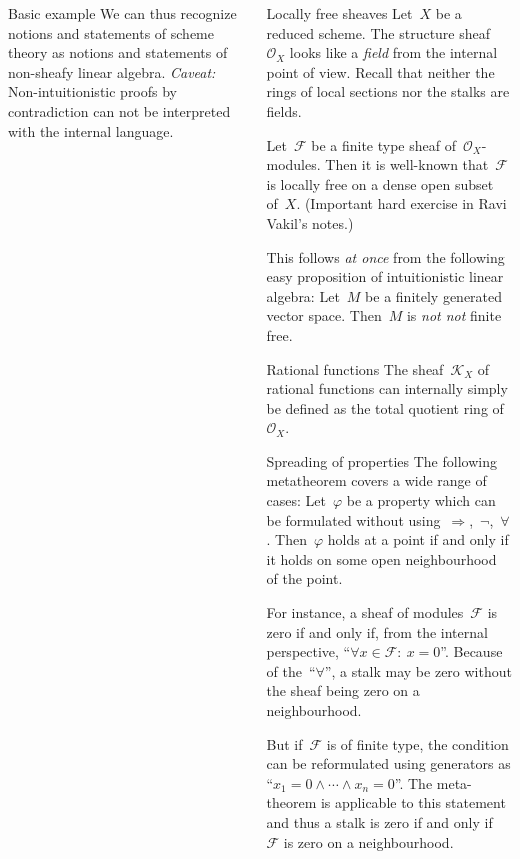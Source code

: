 \documentclass[table]{beamer}
\newcommand{\F}{\mathcal{F}}
\renewcommand{\O}{\mathcal{O}}
\newcommand{\K}{\mathcal{K}}
\begin{document}
\begin{frame}[t]
\begin{columns}[t]
\begin{column}{0.3\textwidth}
\begin{block}{Basic example}
    We can thus recognize notions and statements of scheme theory as notions and
    statements of non-sheafy linear algebra.
    \emph{Caveat:} Non-intuitionistic proofs by contradiction can not be interpreted with the
    internal language.
  \end{block}
\end{column}

\begin{column}{0.3\textwidth}
  \begin{block}{Locally free sheaves}
    Let~$X$ be a reduced scheme. The structure sheaf~$\O_X$ looks like a \emph{field} from the
    internal point of view. Recall that neither the rings of
    local sections nor the stalks are fields.\medskip

    Let~$\F$ be a finite type sheaf of~$\O_X$-modules. 
    Then it is well-known that~$\F$ is locally free on a dense open subset
    of~$X$. (Important hard exercise in Ravi Vakil's notes.) \medskip

    This follows \emph{at once} from the following easy proposition of intuitionistic
    linear algebra: Let~$M$ be a finitely generated vector space. Then~$M$ is
    \emph{not not} finite free.
  \end{block}
  \bigskip

  \begin{block}{Rational functions}
    The sheaf~$\K_X$ of rational functions can internally simply be defined as
    the total quotient ring of~$\O_X$.
  \end{block}
  \bigskip

  \begin{block}{Spreading of properties}
    The following metatheorem covers a wide range of cases:
    Let~$\varphi$ be a property which can be formulated without
    using~$\Rightarrow$,~$\neg$,~$\forall$. Then~$\varphi$
    holds at a point if and only if it holds on some open neighbourhood of the
    point.\medskip

    For instance, a sheaf of modules~$\F$ is zero if and only if, from the
    internal perspective, ``$\forall x \in \F{:}\ x = 0$''. Because of
    the~``$\forall$'', a stalk may be zero without the sheaf being zero on a
    neighbourhood.\medskip

    But if~$\F$ is of finite type, the condition can be reformulated using
    generators as ``$x_1 = 0 \wedge \cdots \wedge x_n = 0$''. The meta-theorem
    is applicable to this statement and thus a stalk is zero if and only if~$\F$
    is zero on a neighbourhood.
  \end{block}


\end{column}
\end{columns}
\end{frame}
\end{document}
